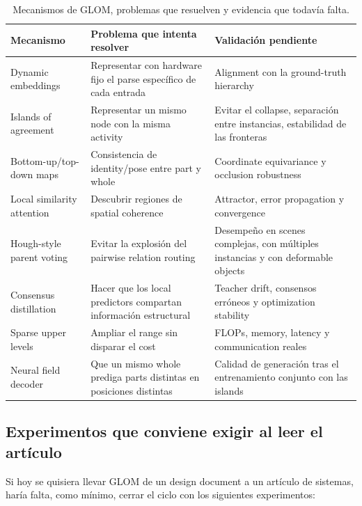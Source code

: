 \documentclass[a4paper]{article}
\begin{document}
\begin{table}[H]
\centering
\small
\caption{Mecanismos de GLOM, problemas que resuelven y evidencia que todavía falta.}
\begin{tabularx}{\textwidth}{L{0.20\textwidth}L{0.30\textwidth}>{\raggedright\arraybackslash}X}
\toprule
Mecanismo & Problema que intenta resolver & Validación pendiente \\
\midrule
Dynamic embeddings & Representar con hardware fijo el parse específico de cada entrada & Alignment con la ground-truth hierarchy \\
Islands of agreement & Representar un mismo node con la misma activity & Evitar el collapse, separación entre instancias, estabilidad de las fronteras \\
Bottom-up/top-down maps & Consistencia de identity/pose entre part y whole & Coordinate equivariance y occlusion robustness \\
Local similarity attention & Descubrir regiones de spatial coherence & Attractor, error propagation y convergence \\
Hough-style parent voting & Evitar la explosión del pairwise relation routing & Desempeño en scenes complejas, con múltiples instancias y con deformable objects \\
Consensus distillation & Hacer que los local predictors compartan información estructural & Teacher drift, consensos erróneos y optimization stability \\
Sparse upper levels & Ampliar el range sin disparar el cost & FLOPs, memory, latency y communication reales \\
Neural field decoder & Que un mismo whole prediga parts distintas en posiciones distintas & Calidad de generación tras el entrenamiento conjunto con las islands \\
\bottomrule
\end{tabularx}
\end{table}

\subsection{Experimentos que conviene exigir al leer el artículo}

Si hoy se quisiera llevar GLOM de un design document a un artículo de sistemas, haría falta, como mínimo, cerrar el ciclo con los siguientes experimentos:
\end{document}
